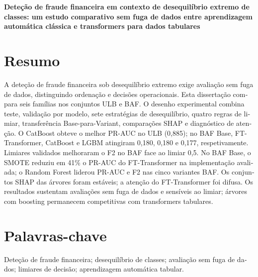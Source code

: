 \begin{otherlanguage}{portuguese}

\begin{center}
\textbf{Deteção de fraude financeira em contexto de desequilíbrio extremo de classes: um estudo comparativo sem fuga de dados entre aprendizagem automática clássica e transformers para dados tabulares}
\end{center}

\section*{Resumo}
\label{sec:resumo}

A deteção de fraude financeira sob desequilíbrio extremo exige avaliação sem fuga de dados, distinguindo ordenação e decisões operacionais. Esta dissertação compara seis famílias nos conjuntos ULB e BAF. O desenho experimental combina teste, validação por modelo, sete estratégias de desequilíbrio, quatro regras de limiar, transferência Base-para-Variant, comparações SHAP e diagnóstico de atenção. O CatBoost obteve o melhor PR-AUC no ULB (0,885); no BAF Base, FT-Transformer, CatBoost e LGBM atingiram 0,180, 0,180 e 0,177, respetivamente. Limiares validados melhoraram o F2 no BAF face ao limiar 0,5. No BAF Base, o SMOTE reduziu em 41\% o PR-AUC do FT-Transformer na implementação avaliada; o Random Forest liderou PR-AUC e F2 nas cinco variantes BAF. Os conjuntos SHAP das árvores foram estáveis; a atenção do FT-Transformer foi difusa. Os resultados sustentam avaliações sem fuga de dados e sensíveis ao limiar; árvores com boosting permanecem competitivas com transformers tabulares.

\section*{Palavras-chave}
\label{sec:palavras}

Deteção de fraude financeira; desequilíbrio de classes; avaliação sem fuga de dados; limiares de decisão; aprendizagem automática tabular.

\end{otherlanguage}
